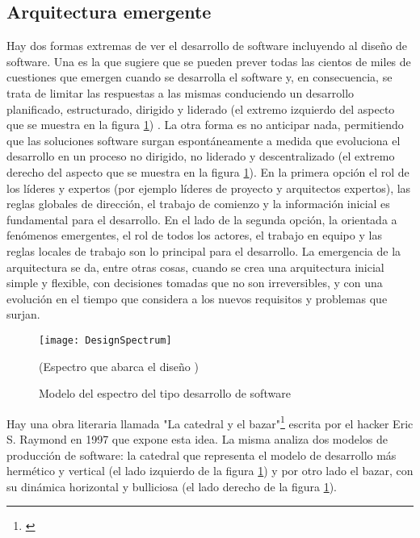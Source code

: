 \subsection{Arquitectura emergente}

Hay dos formas extremas de ver el desarrollo de software incluyendo al diseño de software. Una es la que sugiere que se pueden prever todas las cientos de miles de cuestiones que emergen cuando se desarrolla el software y, en consecuencia, se trata de limitar las respuestas a las mismas conduciendo un desarrollo planificado, estructurado, dirigido y liderado (el extremo izquierdo del aspecto que se muestra en la figura \ref{fig:DesignSpectrum}) \cite{Neal-Ford-2010}. La otra forma es no anticipar nada, permitiendo que las soluciones software surgan espontáneamente a medida que evoluciona el desarrollo en un proceso no dirigido, no liderado y descentralizado (el extremo derecho del aspecto que se muestra en la figura \ref{fig:DesignSpectrum}). En la primera opción el rol de los líderes y expertos (por ejemplo líderes de proyecto y arquitectos expertos), las reglas globales de dirección, el trabajo de comienzo y la información inicial es fundamental para el desarrollo. En el lado de la segunda opción, la orientada a fenómenos emergentes, el rol de todos los actores, el trabajo en equipo y las reglas locales de trabajo son lo principal para el desarrollo. La emergencia de la arquitectura se da, entre otras cosas, cuando se crea una arquitectura inicial simple y flexible, con decisiones tomadas que no son irreversibles, y con una evolución en el tiempo que considera a los nuevos requisitos y problemas que surjan.

\begin{figure}[h] 
  \centering
  \texttt{[image: DesignSpectrum]}
  \caption{Modelo del espectro del tipo desarrollo de software}
  (Espectro que abarca el diseño \cite{Neal-Ford-2010})
  \centering
  \label{fig:DesignSpectrum} %
\end{figure}

Hay una obra literaria llamada "La catedral y el bazar"\footnote{\cite{Eric-Raymond-1997}} escrita por el hacker Eric S. Raymond en 1997 que expone esta idea. La misma analiza dos modelos de producción de software: la catedral que representa el modelo de desarrollo más hermético y vertical (el lado izquierdo de la figura \ref{fig:DesignSpectrum}) y por otro lado el bazar, con su dinámica horizontal y bulliciosa (el lado derecho de la figura \ref{fig:DesignSpectrum}).


